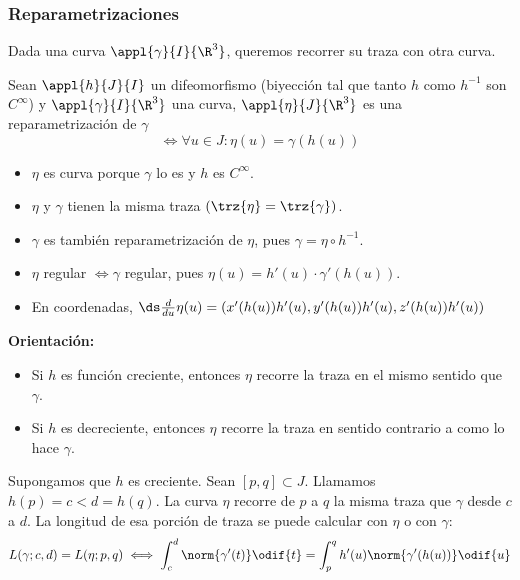 \subsubsection{Reparametrizaciones}

Dada una curva $\appl{\gamma}{I}{\R^3}$, queremos recorrer su traza con otra curva.
\begin{defn}
	Sean $\appl{h}{J}{I}$ un difeomorfismo (biyección tal que tanto $h$ como $h^{-1}$ son $C^\infty$) y $\appl{\gamma}{I}{\R^3}$ una curva, $\appl{\eta}{J}{\R^3}$ es una reparametrización de $\gamma$
	\[ \iff \forall u \in J : \eta(u)=\gamma(h(u))\]
	\begin{itemize}[topsep=1pt, itemsep=1pt,parsep=3pt]
		\item $\eta$ es curva porque $\gamma$ lo es y $h$ es $C^\infty$.
		\item $\eta$ y $\gamma$ tienen la misma traza $(\trz{\eta}=\trz{\gamma})$.
		\item $\gamma$ es también reparametrización de $\eta$, pues $\gamma = \eta \circ h^{-1}$.
		\item $\eta$ regular $\iff \gamma$ regular, pues $\eta(u) = h'(u)\cdot\gamma'(h(u))$.
		\item En coordenadas, $\ds \frac{d}{du}\eta(u)=\left(x'(h(u))h'(u), y'(h(u))h'(u), z'(h(u))h'(u)\right)$
	\end{itemize}
\end{defn}
\noindent \textbf{Orientación:}
\begin{itemize}[topsep=0pt, itemsep=1pt,parsep=3pt]
	\item Si $h$ es función creciente, entonces $\eta$ recorre la traza en el mismo sentido que $\gamma$.
	\item Si $h$ es decreciente, entonces $\eta$ recorre la traza en sentido contrario a como lo hace $\gamma$.
\end{itemize}
Supongamos que $h$ es creciente. Sean $\left[p, q\right]\subset J$. Llamamos $h(p)=c<d=h(q)$. La curva $\eta$ recorre de $p$ a $q$ la misma traza que $\gamma$ desde $c$ a $d$. La longitud de esa porción de traza se puede calcular con $\eta$ o con $\gamma$:
\[L(\gamma; c, d)=L(\eta; p, q) \iff \int_c^d\norm{\gamma'(t)}\odif{t}=\int_p^qh'(u)\norm{\gamma'(h(u))}\odif{u}\]

